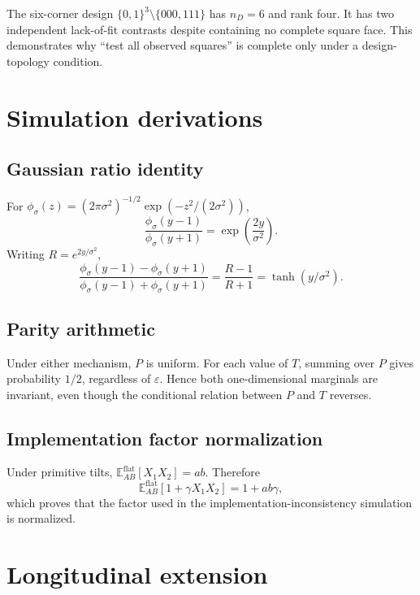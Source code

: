 \documentclass[11pt]{article}
\newcommand{\E}{\mathbb{E}}
\newcommand{\eps}{\varepsilon}
\begin{document}
The six-corner design \(\{0,1\}^3\setminus\{000,111\}\) has \(n_D=6\) and rank four.  It has two independent lack-of-fit contrasts despite containing no complete square face.  This demonstrates why ``test all observed squares'' is complete only under a design-topology condition.

\section{Simulation derivations}

\subsection{Gaussian ratio identity}

For \(\phi_\sigma(z)=(2\pi\sigma^2)^{-1/2}\exp(-z^2/(2\sigma^2))\),
\begin{equation}
\frac{\phi_\sigma(y-1)}{\phi_\sigma(y+1)}
=
\exp\left(\frac{2y}{\sigma^2}\right).
\end{equation}
Writing \(R=e^{2y/\sigma^2}\),
\begin{equation}
\frac{\phi_\sigma(y-1)-\phi_\sigma(y+1)}
{\phi_\sigma(y-1)+\phi_\sigma(y+1)}
=
\frac{R-1}{R+1}
=
\tanh(y/\sigma^2).
\end{equation}

\subsection{Parity arithmetic}

Under either mechanism, \(P\) is uniform.  For each value of \(T\), summing over \(P\) gives probability \(1/2\), regardless of \(\eps\).  Hence both one-dimensional marginals are invariant, even though the conditional relation between \(P\) and \(T\) reverses.

\subsection{Implementation factor normalization}

Under primitive tilts, \(\E_{AB}^{\mathrm{flat}}[X_1X_2]=ab\).  Therefore
\begin{equation}
\E_{AB}^{\mathrm{flat}}[1+\gamma X_1X_2]=1+ab\gamma,
\end{equation}
which proves that the factor used in the implementation-inconsistency simulation is normalized.

\section{Longitudinal extension}
\end{document}
